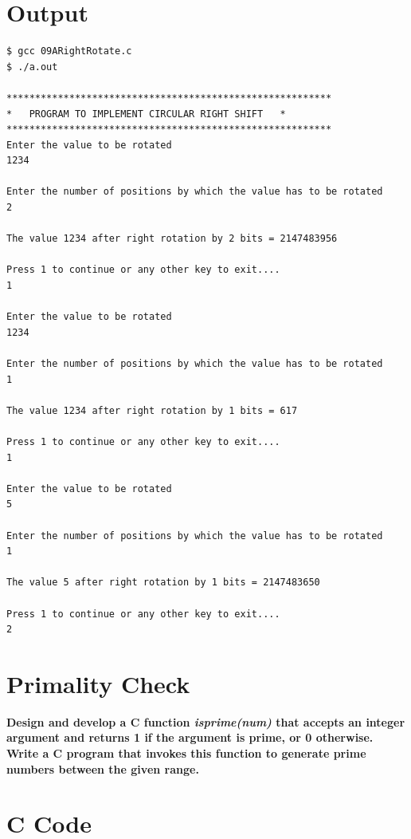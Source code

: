 \documentclass[a4paper]{report}
\begin{document}
\pagebreak
\section*{Output}
\begin{Verbatim}
$ gcc 09ARightRotate.c 
$ ./a.out 

*********************************************************
*	PROGRAM TO IMPLEMENT CIRCULAR RIGHT SHIFT	*
*********************************************************
Enter the value to be rotated
1234

Enter the number of positions by which the value has to be rotated
2

The value 1234 after right rotation by 2 bits = 2147483956

Press 1 to continue or any other key to exit....
1

Enter the value to be rotated
1234

Enter the number of positions by which the value has to be rotated
1

The value 1234 after right rotation by 1 bits = 617

Press 1 to continue or any other key to exit....
1

Enter the value to be rotated
5

Enter the number of positions by which the value has to be rotated
1

The value 5 after right rotation by 1 bits = 2147483650

Press 1 to continue or any other key to exit....
2

\end{Verbatim}

\pagebreak
\section{Primality Check}
{\selectfont \textbf{Design and develop a C function \textit{isprime(num)} that accepts an integer argument and returns 1 if the argument is prime, or 0 otherwise. Write a C program that invokes this function to generate prime numbers between the given range.
}}

\section*{C Code}
\end{document}
